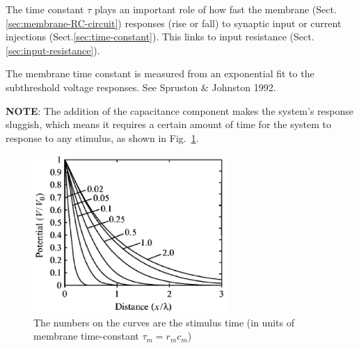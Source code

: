 The time constant $\tau$ plays an important role of how fast the membrane
(Sect.\ref{sec:membrane-RC-circuit}) responses (rise or fall) to synaptic input
or current injections (Sect.\ref{sec:time-constant}). This links to input
resistance (Sect.\ref{sec:input-resistance}).

\begin{mdframed}
The membrane time constant is measured from an exponential fit to the
subthreshold voltage responses. See Spruston \& Johnston 1992.
\end{mdframed}

{\bf NOTE}: The addition of the capacitance component makes the system's response
sluggish, which means it requires a certain amount of time for the system
to response to any stimulus, as shown in Fig.~\ref{fig:V_standardized-x}. 

\begin{figure}[htb]
\centerline{\includegraphics[height=6cm]{./images/V_standardized-x.eps}}
\caption{The numbers on the curves are the stimulus time (in units of
  membrane time-constant $\tau_m = r_m c_m$)}\label{fig:V_standardized-x}
\end{figure}

